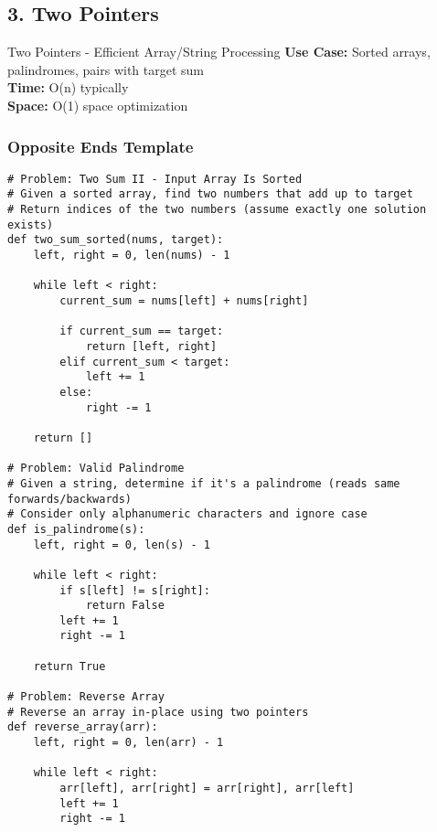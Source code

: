 \documentclass[10pt,a4paper]{article}
\begin{document}
\subsection{3. Two Pointers}

\begin{patternbox}{Two Pointers - Efficient Array/String Processing}
\textbf{Use Case:} Sorted arrays, palindromes, pairs with target sum\\
\textbf{Time:} O(n) typically\\
\textbf{Space:} O(1) space optimization
\end{patternbox}

\subsubsection{Opposite Ends Template}
\begin{lstlisting}
# Problem: Two Sum II - Input Array Is Sorted
# Given a sorted array, find two numbers that add up to target
# Return indices of the two numbers (assume exactly one solution exists)
def two_sum_sorted(nums, target):
    left, right = 0, len(nums) - 1

    while left < right:
        current_sum = nums[left] + nums[right]

        if current_sum == target:
            return [left, right]
        elif current_sum < target:
            left += 1
        else:
            right -= 1

    return []

# Problem: Valid Palindrome
# Given a string, determine if it's a palindrome (reads same forwards/backwards)
# Consider only alphanumeric characters and ignore case
def is_palindrome(s):
    left, right = 0, len(s) - 1

    while left < right:
        if s[left] != s[right]:
            return False
        left += 1
        right -= 1

    return True

# Problem: Reverse Array
# Reverse an array in-place using two pointers
def reverse_array(arr):
    left, right = 0, len(arr) - 1

    while left < right:
        arr[left], arr[right] = arr[right], arr[left]
        left += 1
        right -= 1
\end{lstlisting}
\end{document}
